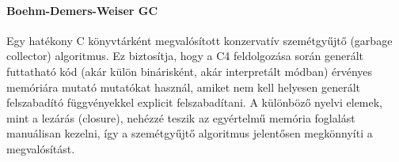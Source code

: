 \paragraph{Boehm-Demers-Weiser GC \cite{boehmGarbageCollector2025}} Egy hatékony\cite{boehmSpaceEfficientConservative2004} C könyvtárként megvalósított konzervatív szemétgyűjtő (garbage collector) algoritmus.
Ez biztosítja, hogy a C4 feldolgozása során generált futtatható kód (akár külön binárisként, akár interpretált módban) érvényes memóriára mutató mutatókat használ, amiket nem kell helyesen generált felszabadító függvényekkel explicit felszabadítani.
A különböző nyelvi elemek, mint a lezárás (closure), nehézzé teszik az egyértelmű memória foglalást manuálisan kezelni, így a szemétgyűjtő algoritmus jelentősen megkönnyíti a megvalósítást.


